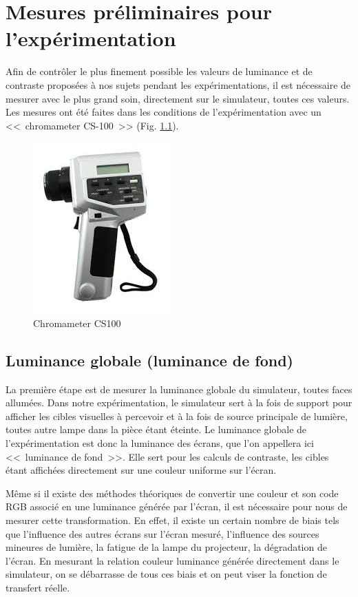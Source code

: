 \chapter{Mesures préliminaires pour l'expérimentation}
\par Afin de contrôler le plus finement possible les valeurs de luminance et de contraste proposées à nos sujets pendant les expérimentations, il est nécessaire de mesurer avec le plus grand soin, directement sur le simulateur, toutes ces valeurs. Les mesures ont été faites dans les conditions de l'expérimentation avec un <<~chromameter CS-100~>> (Fig. \ref{fig:chromameter_cs100}).

\begin{figure}
	\centering
	\includegraphics[scale=1]{Figures/ChromameterCS100}
	\caption{Chromameter CS100}
	\label{fig:chromameter_cs100}
\end{figure}
	
	\section{Luminance globale (luminance de fond)}
	\par La première étape est de mesurer la luminance globale du simulateur, toutes faces allumées. Dans notre expérimentation, le simulateur sert à la fois de support pour afficher les cibles visuelles à percevoir et à la fois de source principale de lumière, toutes autre lampe dans la pièce étant éteinte. Le luminance globale de l'expérimentation est donc la luminance des écrans, que l'on appellera ici <<~luminance de fond~>>. Elle sert pour les calculs de contraste, les cibles étant affichées directement sur une couleur uniforme sur l'écran.
	
	\par Même si il existe des méthodes théoriques de convertir une couleur et son code RGB associé en une luminance générée par l'écran, il est nécessaire pour nous de mesurer cette transformation. En effet, il existe un certain nombre de biais tels que l'influence des autres écrans sur l'écran mesuré, l'influence des sources mineures de lumière, la fatigue de la lampe du projecteur, la dégradation de l'écran. En mesurant la relation couleur luminance générée directement dans le simulateur, on se débarrasse de tous ces biais et on peut viser la fonction de transfert réelle.
	
